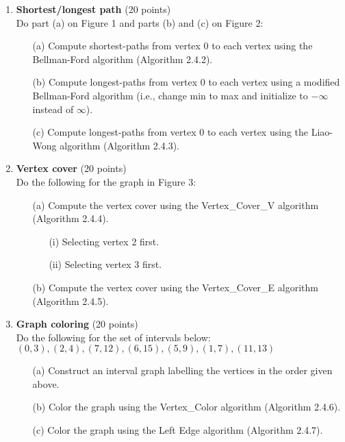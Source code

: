 \begin{enumerate}

\item {\bf Shortest/longest path} (20 points) \\
Do part (a) on Figure 1 and parts (b) and (c) on Figure 2:
\begin{itemize}
\item[(a)] Compute shortest-paths from vertex 0 to each vertex using 
           the Bellman-Ford algorithm (Algorithm 2.4.2). 
\item[(b)] Compute longest-paths from vertex 0 to each vertex using
           a modified Bellman-Ford algorithm (i.e., change min to max 
           and initialize to $-\infty$ instead of $\infty$).
\item[(c)] Compute longest-paths from vertex 0 to each vertex using
           the Liao-Wong algorithm (Algorithm 2.4.3).
\end{itemize}		

\item {\bf Vertex cover} (20 points) \\ 
Do the following for the graph in Figure 3:
\begin{itemize}
\item[(a)] Compute the vertex cover using the Vertex\_Cover\_V algorithm 
           (Algorithm 2.4.4).
\begin{itemize}
\item[(i)] Selecting vertex 2 first.
\item[(ii)] Selecting vertex 3 first.
\end{itemize}		
\item[(b)] Compute the vertex cover using the Vertex\_Cover\_E algorithm 
           (Algorithm 2.4.5).
\end{itemize}		

\item {\bf Graph coloring} (20 points) \\ 
Do the following for the set of intervals below: \\
$(0,3), (2,4), (7,12), (6,15), (5,9), (1,7), (11,13)$
\begin{itemize}
\item[(a)] Construct an interval graph labelling the vertices in the 
           order given above.
\item[(b)] Color the graph using the Vertex\_Color algorithm 
           (Algorithm 2.4.6).
\item[(c)] Color the graph using the Left Edge algorithm
           (Algorithm 2.4.7).
\end{itemize}		


\end{enumerate}
